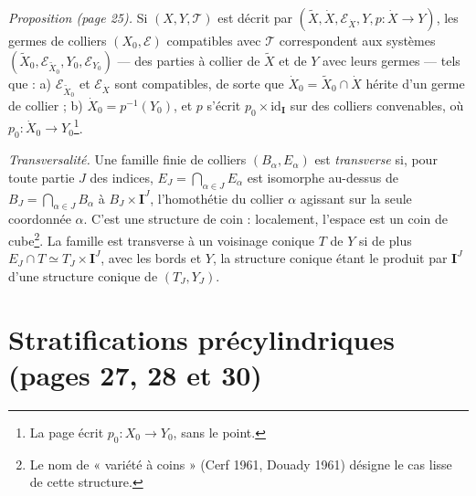 \documentclass[11pt,a4paper]{article}
\begin{document}
\emph{Proposition (page 25).} Si $(X, Y, \mathcal{T})$ est décrit par $(\tilde X,
\dot X, \mathcal{E}_{\dot X}, Y, p : \dot X \to Y)$, les germes de colliers
$(X_0, \mathcal{E})$ compatibles avec $\mathcal{T}$ correspondent aux systèmes
$(\tilde X_0, \mathcal{E}_{\tilde X_0}, Y_0, \mathcal{E}_{Y_0})$ — des parties à
collier de $\tilde X$ et de $Y$ avec leurs germes — tels que : a)
$\mathcal{E}_{\tilde X_0}$ et $\mathcal{E}_{\dot X}$ sont compatibles, de sorte que
$\dot X_0 = \tilde X_0 \cap \dot X$ hérite d'un germe de collier ; b) $\dot X_0 =
p^{-1}(Y_0)$, et $p$ s'écrit $p_0 \times \mathrm{id}_{\mathbf{I}}$ sur des colliers
convenables, où $p_0 : \dot X_0 \to Y_0$\footnote{La page écrit $p_0 : X_0 \to
Y_0$, sans le point.}.

\emph{Transversalité.} Une famille finie de colliers $(B_\alpha, E_\alpha)$ est
\emph{transverse} si, pour toute partie $J$ des indices, $E_J = \bigcap_{\alpha \in J}
E_\alpha$ est isomorphe au-dessus de $B_J = \bigcap_{\alpha\in J} B_\alpha$ à $B_J
\times \mathbf{I}^J$, l'homothétie du collier $\alpha$ agissant sur la seule
coordonnée $\alpha$. C'est une structure de coin : localement, l'espace est un coin
de cube\footnote{Le nom de « variété à coins » (Cerf 1961, Douady 1961) désigne
le cas lisse de cette structure.}. La famille est transverse à un voisinage conique
$T$ de $Y$ si de plus $E_J \cap T \simeq T_J \times \mathbf{I}^J$, avec les bords et
$Y$, la structure conique étant le produit par $\mathbf{I}^J$ d'une structure conique
de $(T_J, Y_J)$.

\section*{Stratifications précylindriques (pages 27, 28 et 30)}
\end{document}
